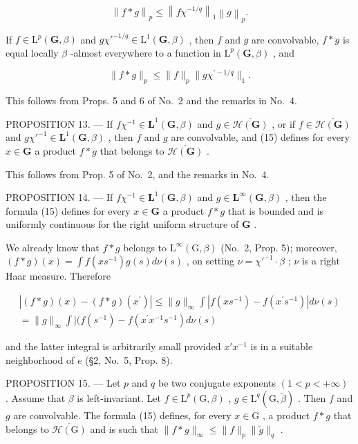 \[
\left\| f * g \right\| _ {p} \leqslant \left\| f \chi^ {- 1 / q} \right\| _ {1} \left\| g \right\| _ {p}.
\]

If \(f \in \mathrm{L}^p(\mathbf{G},\beta)\) and \(g\chi'^{-1/q} \in \mathrm{L}^1(\mathbf{G},\beta)\) , then \(f\) and \(g\) are convolvable, \(f * g\) is equal locally \(\beta\) -almost everywhere to a function in \(\mathrm{L}^p(\mathbf{G},\beta)\) , and

\[
\| f * g \| _ {p} \leqslant \| f \| _ {p} \| g \chi^ {\prime - 1 / q} \| _ {1}.
\]

This follows from Props. 5 and 6 of No.~2 and the remarks in No.~4.

PROPOSITION 13. --- If \(f\chi^{-1} \in \mathbf{L}^1(\mathbf{G}, \beta)\) and \(g \in \overline{\mathcal{H}(\mathbf{G})}\) , or if \(f \in \overline{\mathcal{H}(\mathbf{G})}\) and \(g\chi'^{-1} \in \mathbf{L}^1(\mathbf{G}, \beta)\) , then \(f\) and \(g\) are convolvable, and (15) defines for every \(x \in \mathbf{G}\) a product \(f * g\) that belongs to \(\overline{\mathcal{H}(\mathbf{G})}\) .

This follows from Prop. 5 of No.~2, and the remarks in No.~4.

PROPOSITION 14. --- If \(f\chi^{-1} \in \mathbf{L}^1(\mathbf{G}, \beta)\) and \(g \in \mathbf{L}^\infty(\mathbf{G}, \beta)\) , then the formula (15) defines for every \(x \in \mathbf{G}\) a product \(f * g\) that is bounded and is uniformly continuous for the right uniform structure of \(\mathbf{G}\) .

We already know that \(f * g\) belongs to \(\mathrm{L}^{\infty}(\mathrm{G},\beta)\) (No.~2, Prop. 5); moreover, \((f*g)(x) = \int f(xs^{-1})g(s)d\nu(s)\) , on setting \(\nu = \chi'^{-1}\cdot \beta\) ; \(\nu\) is a right Haar measure. Therefore

\[
\begin{array}{c} | (f * g) (x) - (f * g) (x ^ {\prime}) | \leqslant \| g \| _ {\infty} \int | f (x s ^ {- 1}) - f (x ^ {\prime} s ^ {- 1}) | d \nu (s) \\ = \| g \| _ {\infty} \int | (f (s ^ {- 1}) - f (x ^ {\prime} x ^ {- 1} s ^ {- 1}) d \nu (s) \end{array}
\]

and the latter integral is arbitrarily small provided \(x'x^{-1}\) is in a suitable neighborhood of \(e\) (§2, No.~5, Prop. 8).

PROPOSITION 15. --- Let \(p\) and \(q\) be two conjugate exponents \((1 < p < +\infty)\) . Assume that \(\beta\) is left-invariant. Let \(f \in \mathrm{L}^p(\mathrm{G}, \beta)\) , \(g \in \mathrm{L}^q(\mathrm{G}, \breve{\beta})\) . Then \(f\) and \(g\) are convolvable. The formula (15) defines, for every \(x \in \mathrm{G}\) , a product \(f * g\) that belongs to \(\overline{\mathcal{H}(\mathrm{G})}\) and is such that \(\| f * g \|_{\infty} \leqslant \| f \|_p \| \breve{g} \|_q\) .

